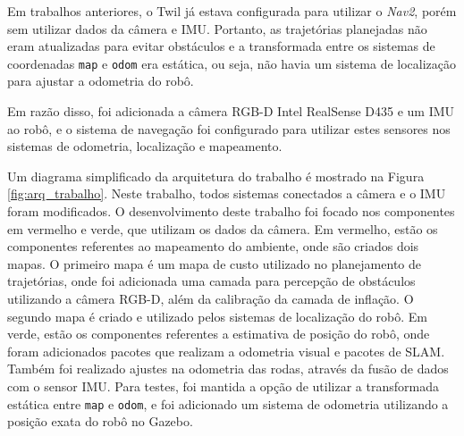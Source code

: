 \documentclass[repeatfields,xlists,xpacks,oneside,yearsonly]{ufrgscca}
\begin{document}
Em trabalhos anteriores, o Twil já estava configurada para utilizar o \textit{Nav2},
porém sem utilizar dados da câmera e IMU. 
Portanto, as trajetórias planejadas não eram atualizadas
para evitar obstáculos e a transformada entre os sistemas de coordenadas 
\texttt{map} e \texttt{odom} era estática, ou seja,
não havia um sistema de localização para ajustar a odometria do robô.

Em razão disso, foi adicionada a câmera RGB-D Intel RealSense D435 e um IMU ao robô,
e o sistema de navegação foi configurado para utilizar estes sensores nos sistemas
de odometria, localização e mapeamento.


Um diagrama simplificado da arquitetura do trabalho é mostrado na 
Figura \ref{fig:arq_trabalho}.
Neste trabalho, todos sistemas conectados a câmera e o IMU foram modificados.
O desenvolvimento deste trabalho foi focado nos componentes em vermelho 
e verde, que utilizam os dados da câmera.
Em vermelho, estão os componentes referentes ao mapeamento do ambiente,
onde são criados dois mapas.
O primeiro mapa é um mapa de custo utilizado no planejamento de trajetórias,
onde foi adicionada uma camada para percepção de obstáculos utilizando 
a câmera RGB-D, além da calibração da camada de inflação.
O segundo mapa é criado e utilizado pelos sistemas de localização do robô.
Em verde, estão os componentes referentes a estimativa de
posição do robô, onde foram adicionados pacotes que realizam a 
odometria visual e pacotes de SLAM.
Também foi realizado ajustes na odometria das rodas, através da fusão 
de dados com o sensor IMU.
Para testes, foi mantida a opção de utilizar a transformada estática entre
\texttt{map} e \texttt{odom}, e foi adicionado um sistema de odometria
utilizando a posição exata do robô no Gazebo.
\end{document}
